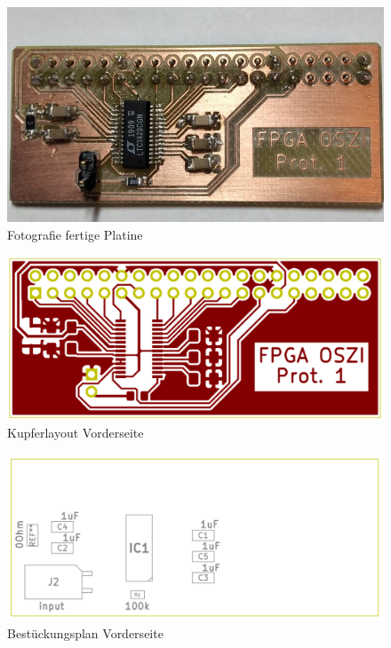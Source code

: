 \begin{figure}[H]
\begin{center}
\includegraphics[width = 15cm]{SAUER/Grafiken/Prot1/Foto.jpeg}
\caption{Fotografie fertige Platine}
\end{center}
\end{figure}
\begin{figure}[H]
\begin{center}
\includegraphics[width = 15cm]{SAUER/Grafiken/Prot1/FCU.png}
\caption{Kupferlayout Vorderseite}
\end{center}
\end{figure}
\begin{figure}[H]
\begin{center}
\includegraphics[width = 15cm]{SAUER/Grafiken/Prot1/FFAB.png}
\caption{Bestückungsplan Vorderseite}
\end{center}
\end{figure}
